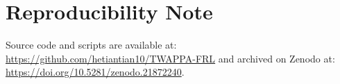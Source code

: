 \documentclass{article}
\begin{document}
\section{Reproducibility Note}
Source code and scripts are available at:\\
\url{https://github.com/hetiantian10/TWAPPA-FRL} 
and archived on Zenodo at:\\
\url{https://doi.org/10.5281/zenodo.21872240}.



\end{document}
